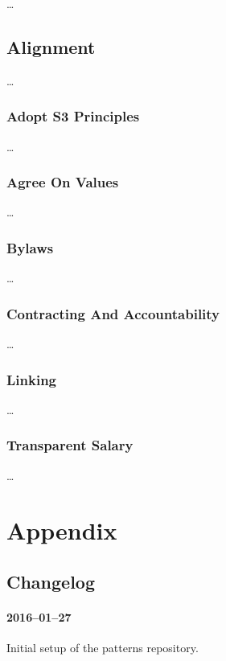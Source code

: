 {\ldots}

\chapter{Alignment}
\label{alignment}

{\ldots}

\section{Adopt S3 Principles}
\label{adopts3principles}

{\ldots}

\section{Agree On Values}
\label{agreeonvalues}

{\ldots}

\section{Bylaws}
\label{bylaws}

{\ldots}

\section{Contracting And Accountability}
\label{contractingandaccountability}

{\ldots}

\section{Linking}
\label{linking}

{\ldots}

\section{Transparent Salary}
\label{transparentsalary}

{\ldots}

\part{Appendix}
\label{appendix}

\chapter{Changelog}
\label{changelog}

\subsection{2016--01--27}
\label{2016-01-27}

Initial setup of the patterns repository.
